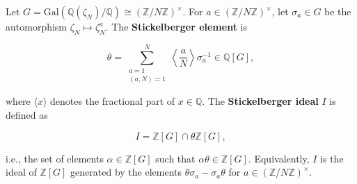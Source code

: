 Let $G = \mathrm{Gal}(\mathbb{Q}(\zeta_N)/\mathbb{Q}) \cong (\mathbb{Z}/N\mathbb{Z})^\times$.
For $a \in (\mathbb{Z}/N\mathbb{Z})^\times$, let $\sigma_a \in G$ be the automorphism
$\zeta_N \mapsto \zeta_N^a$. The \textbf{Stickelberger element} is

$$\theta = \sum_{\substack{a=1 \\ (a,N)=1}}^N \left\langle \frac{a}{N} \right\rangle \sigma_a^{-1} \in \mathbb{Q}[G],$$

where $\langle x \rangle$ denotes the fractional part of $x \in \mathbb{Q}$.
The \textbf{Stickelberger ideal} $I$ is defined as

$$I = \mathbb{Z}[G] \cap \theta \mathbb{Z}[G],$$

i.e., the set of elements $\alpha \in \mathbb{Z}[G]$ such that $\alpha \theta \in \mathbb{Z}[G]$.
Equivalently, $I$ is the ideal of $\mathbb{Z}[G]$ generated by the elements
$\theta \sigma_a - \sigma_a \theta$ for $a \in (\mathbb{Z}/N\mathbb{Z})^\times$.
